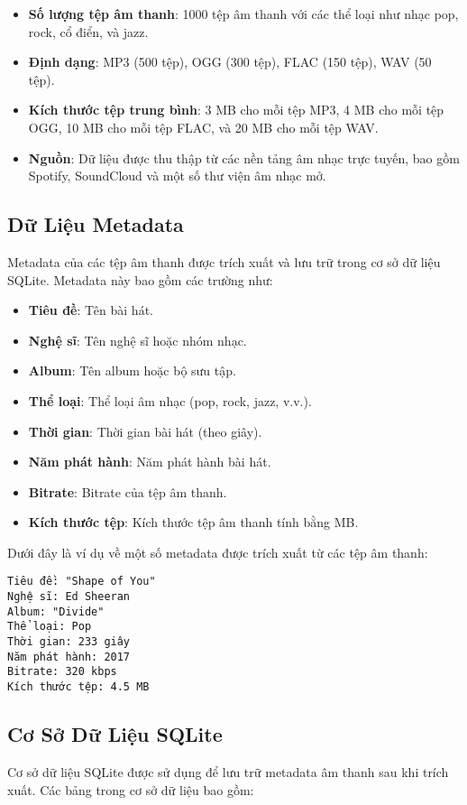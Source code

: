 \documentclass[conference]{IEEEtran}
\begin{document}
\begin{itemize}
    \item \textbf{Số lượng tệp âm thanh}: 1000 tệp âm thanh với các thể loại như nhạc pop, rock, cổ điển, và jazz.
    \item \textbf{Định dạng}: MP3 (500 tệp), OGG (300 tệp), FLAC (150 tệp), WAV (50 tệp).
    \item \textbf{Kích thước tệp trung bình}: 3 MB cho mỗi tệp MP3, 4 MB cho mỗi tệp OGG, 10 MB cho mỗi tệp FLAC, và 20 MB cho mỗi tệp WAV.
    \item \textbf{Nguồn}: Dữ liệu được thu thập từ các nền tảng âm nhạc trực tuyến, bao gồm Spotify, SoundCloud và một số thư viện âm nhạc mở.
\end{itemize}

\subsection{Dữ Liệu Metadata}
Metadata của các tệp âm thanh được trích xuất và lưu trữ trong cơ sở dữ liệu SQLite. Metadata này bao gồm các trường như:

\begin{itemize}
    \item \textbf{Tiêu đề}: Tên bài hát.
    \item \textbf{Nghệ sĩ}: Tên nghệ sĩ hoặc nhóm nhạc.
    \item \textbf{Album}: Tên album hoặc bộ sưu tập.
    \item \textbf{Thể loại}: Thể loại âm nhạc (pop, rock, jazz, v.v.).
    \item \textbf{Thời gian}: Thời gian bài hát (theo giây).
    \item \textbf{Năm phát hành}: Năm phát hành bài hát.
    \item \textbf{Bitrate}: Bitrate của tệp âm thanh.
    \item \textbf{Kích thước tệp}: Kích thước tệp âm thanh tính bằng MB.
\end{itemize}

Dưới đây là ví dụ về một số metadata được trích xuất từ các tệp âm thanh:

\begin{verbatim}
Tiêu đề: "Shape of You"
Nghệ sĩ: Ed Sheeran
Album: "Divide"
Thể loại: Pop
Thời gian: 233 giây
Năm phát hành: 2017
Bitrate: 320 kbps
Kích thước tệp: 4.5 MB
\end{verbatim}

\subsection{Cơ Sở Dữ Liệu SQLite}
Cơ sở dữ liệu SQLite được sử dụng để lưu trữ metadata âm thanh sau khi trích xuất. Các bảng trong cơ sở dữ liệu bao gồm:
\end{document}
